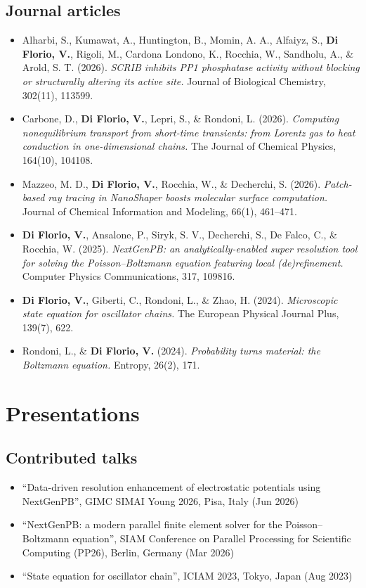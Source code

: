 \documentclass[11pt]{article}
\begin{document}
\subsection{Journal articles}
\begin{itemize}
  \item Alharbi, S., Kumawat, A., Huntington, B., Momin, A. A., Alfaiyz, S., \textbf{Di Florio, V.}, Rigoli, M., Cardona Londono, K., Rocchia, W., Sandholu, A., \& Arold, S. T. (2026). \emph{SCRIB inhibits PP1 phosphatase activity without blocking or structurally altering its active site.} Journal of Biological Chemistry, 302(11), 113599. 
  \item Carbone, D., \textbf{Di Florio, V.}, Lepri, S., \& Rondoni, L. (2026). \emph{Computing nonequilibrium transport from short-time transients: from Lorentz gas to heat conduction in one-dimensional chains.} The Journal of Chemical Physics, 164(10), 104108. 
  \item Mazzeo, M. D., \textbf{Di Florio, V.}, Rocchia, W., \& Decherchi, S. (2026). \emph{Patch-based ray tracing in NanoShaper boosts molecular surface computation.} Journal of Chemical Information and Modeling, 66(1), 461–471. 
  \item \textbf{Di Florio, V.}, Ansalone, P., Siryk, S. V., Decherchi, S., De Falco, C., \& Rocchia, W. (2025). \emph{NextGenPB: an analytically-enabled super resolution tool for solving the Poisson–Boltzmann equation featuring local (de)refinement.} Computer Physics Communications, 317, 109816. 
  \item \textbf{Di Florio, V.}, Giberti, C., Rondoni, L., \& Zhao, H. (2024). \emph{Microscopic state equation for oscillator chains.} The European Physical Journal Plus, 139(7), 622. 
  \item Rondoni, L., \& \textbf{Di Florio, V.} (2024). \emph{Probability turns material: the Boltzmann equation.} Entropy, 26(2), 171. 
\end{itemize}

\section{Presentations}
\subsection{Contributed talks}
\begin{itemize}
  \item “Data-driven resolution enhancement of electrostatic potentials using NextGenPB”, GIMC SIMAI Young 2026, Pisa, Italy (Jun 2026)
  \item “NextGenPB: a modern parallel finite element solver for the Poisson–Boltzmann equation”, SIAM Conference on Parallel Processing for Scientific Computing (PP26), Berlin, Germany (Mar 2026)
  \item “State equation for oscillator chain”, ICIAM 2023, Tokyo, Japan (Aug 2023)
\end{itemize}
\end{document}
